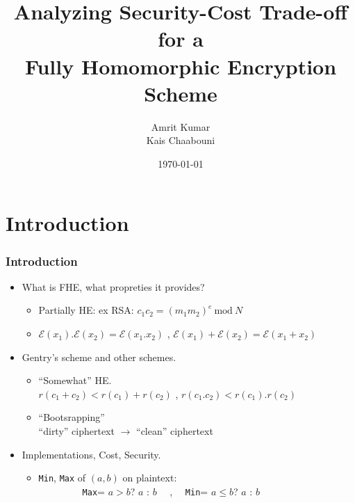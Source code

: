 \documentclass{beamer}
\title[Fully Homomorphic Encryption Scheme]{Analyzing Security-Cost Trade-off for a\\Fully Homomorphic Encryption Scheme}
\author{Amrit Kumar \\ Kais Chaabouni \\}
\date{\today}
\institute{Ensimag}
\begin{document}
\begin{frame}
  \titlepage
\end{frame}

\section{Introduction}

\begin{frame}\frametitle{Introduction}
  \begin{itemize}
  \item What is FHE, what propreties it provides?\\
    
    \begin{itemize}
      \pause
    \item Partially HE: ex RSA: $c_1c_2=(m_1m_2)^e \ \textrm {mod}\ N$
      \pause
    \item $\mathcal{E}(x_1).\mathcal{E}(x_2)=\mathcal{E}(x_1.x_2)$ , $\mathcal{E}(x_1)+\mathcal{E}(x_2)=\mathcal{E}(x_1+x_2)$   
      
    \end{itemize}
    \pause
  \item Gentry's scheme and other schemes.  
    
    \begin{itemize}
      \pause
    \item ``Somewhat'' HE. \\ 
      \pause
      $r(c_1+c_2) < r(c_1)+r(c_2)$ , $r(c_1.c_2) < r(c_1).r(c_2)$
      \pause
    \item ``Bootsrapping'' \\ 
      \pause
      ``dirty'' ciphertext $\rightarrow$ ``clean'' ciphertext
      
    \end{itemize}
    \pause
  \item Implementations, Cost, Security. \\
    
    \begin{itemize}
      \pause
    \item \texttt{Min}, \texttt{Max} of $(a,b)$ on plaintext:\\
      \ \ \ \ \ \ \ \ \ \texttt{Max}= $a > b$? $a$ : $b$ \ \ , \ \ \texttt{Min}= $a \leq b$? $a$ : $b$ 
      \pause
    \end{itemize}
  \end{itemize}
\end{frame}
\end{document}

